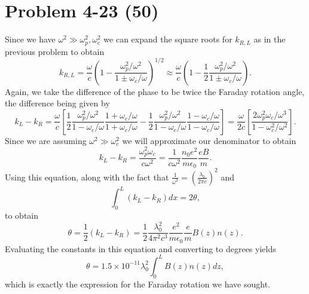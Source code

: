 \section*{Problem 4-23 (50)}
\label{sec:4-23}
Since we have \(\omega^2 \gg \omega_p^2,\omega^2_c \) we can expand the square roots for \(k_{R,L} \) as in the previous problem to obtain
\begin{equation*}
	k_{R,L} = \dfrac{\omega}{c}\left(1 - \dfrac{\omega_p^2/\omega^2}{1 \pm \omega_c/\omega} \right)^{1/2} \approx \dfrac{\omega}{c} \left(1 - \dfrac{1}{2}\dfrac{\omega_p^2/\omega^2}{1 \pm \omega_c/\omega} \right).
\end{equation*}
Again, we take the difference of the phase to be twice the Faraday rotation angle, the difference being given by
\begin{equation*}
	k_L - k_R = \dfrac{\omega}{c}\left[\dfrac{1}{2}\dfrac{\omega_p^2/\omega^2}{1 - \omega_c/\omega}\dfrac{1 + \omega_c/\omega}{1 + \omega_c/\omega} - \dfrac{1}{2}\dfrac{\omega_p^2/\omega^2}{1 - \omega_c/\omega}\dfrac{1 - \omega_c/\omega}{1 - \omega_c/\omega}  \right] = \dfrac{\omega}{2c}\left[\dfrac{2\omega_p^2\omega_c/\omega^3}{1 - \omega_c^2/\omega^2} \right].
\end{equation*}
Since we are assuming \(\omega^2 \gg \omega_c^2  \) we will approximate our denominator to obtain
\begin{equation*}
	k_L-k_R = \dfrac{\omega^2_p\omega_c}{c\omega^2} = \dfrac{1}{c\omega^2}\dfrac{n_0e^2}{m\epsilon_0}\dfrac{eB}{m}.
\end{equation*}
Using this equation, along with the fact that \(\frac{1}{\omega^2} = \left(\frac{\lambda_0}{2\pi c}\right)^2 \) and 
\begin{equation*}
	\int_0^L (k_L - k_R)dx = 2\theta,
\end{equation*}
to obtain
\begin{equation*}
	\theta = \dfrac{1}{2}\left(k_L - k_R\right) = \dfrac{1}{2}\dfrac{\lambda_0^2}{4\pi^2c^3}\dfrac{e^2}{m\epsilon_0}\dfrac{e}{m}B(z)n(z).
\end{equation*}
Evaluating the constants in this equation and converting to degrees yields
\begin{equation*}
	\theta = 1.5\times10^{-11}\lambda_0^2\int_{0}^{L}B(z)n(z)dz,
\end{equation*}
which is exactly the expression for the Faraday rotation we have sought. 


